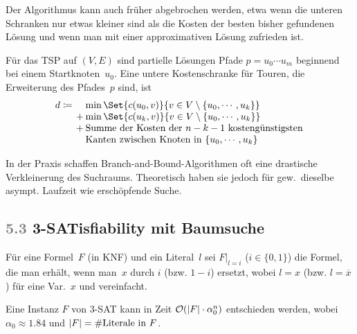 \documentclass{cheat-sheet}
\renewcommand{\O}{\mathcal{O}} %
\newcommand{\Problem}[1]{\textcolor{ProblemColor}{\textbf{#1}}}
\newcommand{\scriptSection}[1]{\textcolor{gray}{#1}\enspace}
\begin{document}
\begin{bem}
  Der Algorithmus kann auch früher abgebrochen werden, etwa wenn die unteren Schranken nur etwas kleiner sind als die Kosten der besten bisher gefundenen Lösung und wenn man mit einer approximativen Lösung zufrieden ist.
\end{bem}

\begin{bsp}
  Für das TSP auf $(V, E)$ sind partielle Lösungen Pfade $p = u_0 \cdots u_m$ beginnend bei einem Startknoten~$u_0$.
  Eine untere Kostenschranke für Touren, die Erweiterung des Pfades~$p$ sind, ist
  \[
    \arraycolsep=1pt
    d \coloneqq
    \begin{array}[t]{r l}
      & \min \Set{c(u_0, v)}{v \in V \setminus \{ u_0, \cdots, u_k \}} \\
      +& \min \Set{c(u_k, v)}{v \in V \setminus \{ u_0, \cdots, u_k \}} \\
      +& \text{Summe der Kosten der $n-k-1$ kostengünstigsten} \\
      & \text{Kanten zwischen Knoten in } \{ u_0, \cdots, u_k \}
    \end{array}
  \]
\end{bsp}

\begin{bem}
  In der Praxis schaffen Branch-and-Bound-Algorithmen oft eine drastische Verkleinerung des Suchraums.
  Theoretisch haben sie jedoch für gew.\ dieselbe asympt. Laufzeit wie erschöpfende Suche.
\end{bem}

\subsection{\scriptSection{5.3} \Problem{3-SATisfiability} mit Baumsuche}

\begin{nota}
  Für eine Formel~$F$ (in KNF) und ein Literal~$l$ sei $F|_{l=i}$ ($i \!\in\! \{0,1\}$) die Formel, die man erhält, wenn man~$x$ durch $i$ (bzw. $1 \!-\! i$) ersetzt, wobei $l \!=\! x$ (bzw. $l \!=\! \overline{x}$) für eine Var.~$x$ und vereinfacht.
\end{nota}

\begin{satz}
  Eine Instanz $F$ von 3-SAT kann in Zeit $\O(\abs{F} \cdot \alpha_0^n)$ entschieden werden, wobei $\alpha_0 \approx 1.84$ und $\lvert F\rvert = \#\text{Literale in~$F$}$.
\end{satz}
\end{document}
